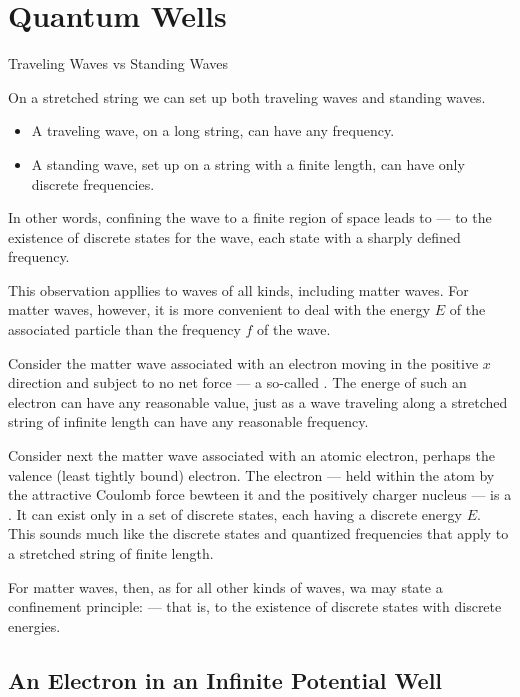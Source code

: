 \newpage
\section{Quantum Wells}

Traveling Waves vs Standing Waves

On a stretched string we can set up both traveling waves and standing waves. 
\begin{itemize}
    \item A traveling wave, on a long string, can have any frequency. 
    \item A standing wave, set up on a string with a finite length, can have only discrete frequencies. 
\end{itemize}
In other words, confining the wave to a finite region of space leads to  --- to the existence of discrete states for the wave, each state with a sharply defined frequency.  

This observation appllies to waves of all kinds, including matter waves. For matter waves, however, it is more convenient to deal with the energy $E$ of the associated particle than the frequency $f$ of the wave. 

Consider the matter wave associated with an electron moving in the positive $x$ direction and subject to no net force --- a so-called . The energe of such an electron can have any reasonable value, just as a wave traveling along a stretched string of infinite length can have any reasonable frequency. 

Consider next the matter wave associated with an atomic electron, perhaps the valence (least tightly bound) electron. The electron --- held within the atom by the attractive Coulomb force bewteen it and the positively charger nucleus --- is a . It can exist only in a set of discrete states, each having a discrete energy $E$. This sounds much like the discrete states and quantized frequencies that apply to a stretched string of finite length. 

For matter waves, then, as for all other kinds of waves, wa may state a confinement principle:  --- that is, to the existence of discrete states with discrete energies. 

\quad

\subsection{An Electron in an Infinite Potential Well}


